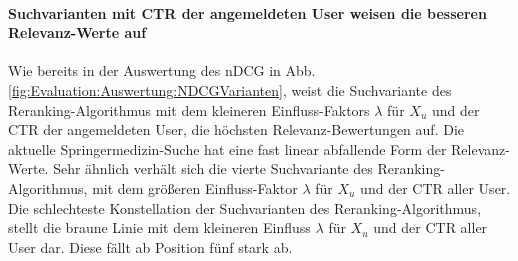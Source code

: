 \paragraph{Suchvarianten mit CTR der angemeldeten User weisen die besseren Relevanz-Werte auf}
Wie bereits in der Auswertung des nDCG in Abb. \ref{fig:Evaluation:Auswertung:NDCGVarianten}, weist die Suchvariante des Reranking-Algorithmus mit dem kleineren Einfluss-Faktors $\lambda$ für $X_u$ und der CTR der angemeldeten User, die höchsten Relevanz-Bewertungen auf. Die aktuelle Springermedizin-Suche hat eine fast linear abfallende Form der Relevanz-Werte. Sehr ähnlich verhält sich die vierte Suchvariante des Reranking-Algorithmus, mit dem größeren Einfluss-Faktor $\lambda$ für $X_u$ und der CTR aller User. Die schlechteste Konstellation der Suchvarianten des Reranking-Algorithmus, stellt die braune Linie mit dem kleineren Einfluss $\lambda$ für $X_u$ und der CTR aller User dar. Diese fällt ab Position fünf stark ab.